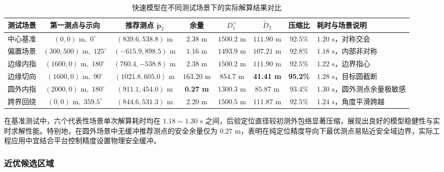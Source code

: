 \documentclass[zihao=-4,a4paper,UTF8]{ctexart}
\begin{document}
\begin{table}[htbp]
    \centering
    \footnotesize
    \vspace{-0.6em}
    \caption{快速模型在不同测试场景下的实际解算结果对比}
    \label{tab:q2_scenarios}
    \renewcommand{\arraystretch}{1.04}
    \begin{tabularx}{\linewidth}{l c c c c c c X}
        \toprule[1.5pt]
        \textbf{测试场景} & \textbf{第一测点与示向} & \textbf{推荐测点} $\widetilde{\mathbf{p}}_2$ & \textbf{余量} & $D_1^+$ & $\widetilde{D}_2$ & \textbf{压缩比} & \textbf{耗时与场景说明} \\
        \midrule
        中心基准 & $(0, 0)\text{ m},\; 0^\circ$ & $(839.6, 538.8)\text{ m}$ & $2.38\text{ m}$ & $1500.2\text{ m}$ & $111.90\text{ m}$ & $92.5\%$ & $1.20\text{ s}$，对称交会 \\
        偏置场景 & $(300, 500)\text{ m},\; 125^\circ$ & $(-615.9, 898.5)\text{ m}$ & $1.16\text{ m}$ & $1493.9\text{ m}$ & $107.21\text{ m}$ & $92.8\%$ & $1.18\text{ s}$，内部非对称 \\
        边缘内指 & $(1600, 0)\text{ m},\; 180^\circ$ & $(760.4, -538.8)\text{ m}$ & $2.38\text{ m}$ & $1500.2\text{ m}$ & $111.90\text{ m}$ & $92.5\%$ & $1.22\text{ s}$，边界指心 \\
        边缘切向 & $(1600, 0)\text{ m},\; 90^\circ$ & $(1021.8, 605.0)\text{ m}$ & $163.20\text{ m}$ & $854.7\text{ m}$ & \textbf{41.41 m} & \textbf{95.2\%} & $1.28\text{ s}$，目标圆截断 \\
        圆外内指 & $(2000, 0)\text{ m},\; 180^\circ$ & $(911.1, 454.0)\text{ m}$ & \textbf{0.27 m} & $1300.3\text{ m}$ & $85.87\text{ m}$ & $93.4\%$ & $1.30\text{ s}$，圆外测点余量极敏感 \\
        跨界回绕 & $(0, 0)\text{ m},\; 359.5^\circ$ & $(844.6, 531.3)\text{ m}$ & $2.20\text{ m}$ & $1500.5\text{ m}$ & $111.87\text{ m}$ & $92.5\%$ & $1.24\text{ s}$，角度平滑跨越 \\
        \bottomrule[1.5pt]
    \end{tabularx}
    \vspace{-0.6em}
\end{table}

在基准测试中，六个代表性场景单次解算耗时均在 $1.18\sim 1.30\text{ s}$ 之间，后验定位直径较初测外包络显著压缩，展现出良好的模型稳健性与实时求解性能。特别地，在圆外场景中无缓冲推荐测点的安全余量仅为 $0.27\text{ m}$，表明在纯定位精度导向下最优测点易贴近安全域边界，实际工程应用中宜结合平台控制精度设置物理安全缓冲。

\subsubsection{近优候选区域}
\end{document}

